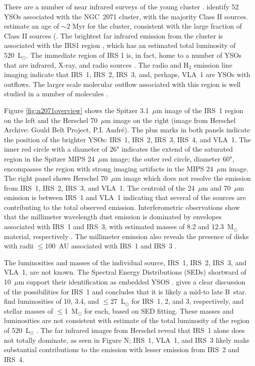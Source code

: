 There are a number of near infrared surveys of the young cluster \citep[e.g.,][]{Strom1976,Lada1991,Megeath2012,Spezzi2015}. \cite{Spezzi2015} identify 52 YSOs associated with the NGC~2071 cluster, with the majority Class II sources. \cite{Flaherty2008} estimate an age of $\sim$2 Myr for the cluster, consistent with the large fraction of Class II sources (\cite{Evans2009}. The brightest far infrared emission from the cluster is associated with the IRS1 region \citep{Harvey1979,Butner1990}, which has an estimated total luminosity of 520~L$_\odot$. The immediate region of IRS 1 is, in fact, home to a number of YSOs that are infrared, X-ray, and radio sources \citep{Skinner2009,C-G2012,Kempen2012}. The radio \citep{C-G2012} and H$_2$ emission line imaging indicate that IRS~1, IRS~2, IRS~3, and, perhaps, VLA~1 are YSOs with outflows. The larger scale molecular outflow associated with this region is well studied in a number of molecules \citep{Bally1982,Chernin1993,Stoji2008}.

Figure \ref{fig:n2071overview} shows the Spitzer 3.1~$\mu$m image of the IRS~1 region on the left \citep[image from Spitzer Archive:][]{Megeath2012} and the Herschel 70~$\mu$m image on the right (image from Herschel Archive: Gould Belt Project, P.I. Andr\'e). The plus marks in both panels indicate the position of the brighter YSOs: IRS~1, IRS~2, IRS~3, IRS~4, and VLA~1. The inner red circle with a diameter of 26" indicates the extend of the saturated region in the Spitzer MIPS 24~$\mu$m image; the outer red circle, diameter 60", encompasses the region with strong imaging artifacts in the MIPS 24~$\mu$m image.
The right panel shows Herschel 70~$\mu$m image which does not resolve the emission from IRS~1, IRS~2, IRS~3, and VLA~1. The centroid of the 24~$\mu$m and 70~$\mu$m emission is between IRS~1 and VLA~1 indicating that several of the sources are contributing to the total observed emission. Interferometric observations show that the millimeter wavelength dust emission is dominated by envelopes associated with IRS~1 and IRS~3, with estimated masses of 8.2 and 12.3~M$_\odot$ material, respectively \citep{Kempen2012}. The millimeter emission also reveals the presence of disks with radii $\le$100~AU associated with IRS~1 and IRS~3 \citep{Kempen2012}.

The luminosities and masses of the individual source, IRS~1, IRS~2, IRS~3, and VLA~1, are not known. The Spectral Energy Distributions (SEDs) shortward of 10~$\mu$m support their identification as embedded YSOS \citep{Skinner2009}. \cite{Skinner2009} gives a clear discussion of the possibilities for IRS~1 and concludes that it is likely a mid-to late B~star. \cite{Kempen2012} find luminosities of 10, 3.4, and $\le$27~L$_\odot$ for IRS~1, 2, and 3, respectively, and stellar masses of $\le$1~M$_\odot$ for each, based on SED fitting. These masses and luminosities are not consistent with estimate of the total luminosity of the region of 520~L$_\odot$ \citep{Butner1990}. The far infrared images from Herschel reveal that IRS~1 alone does not totally dominate, as seen in Figure N; IRS~1, VLA~1, and IRS~3 likely make substantial contributions to the emission with lesser emission from IRS~2 and IRS~4.

